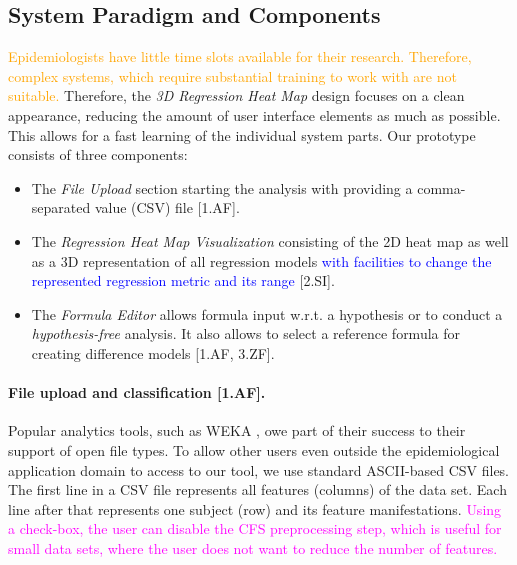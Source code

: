 \documentclass[journal]{style/vgtc} 			          %
\newcommand{\add}[1]{\textcolor{blue}{#1}}
\newcommand{\design}[1]{\textcolor{orange}{#1}}
\newcommand{\magenta}[1]{\textcolor{magenta}{#1}}
\begin{document}
\subsection{System Paradigm and Components}
\design{
Epidemiologists have little time slots available for their research.
Therefore, complex systems, which require substantial training to work with are not suitable. %
}
Therefore, the \emph{3D Regression Heat Map} design focuses on a clean appearance, reducing the amount of user interface elements as much as possible.
This allows for a fast learning of the individual system parts.
Our prototype consists of three components:
\begin{itemize}
	\item The \emph{File Upload} section starting the analysis with providing a comma-separated value (CSV) file [1.AF].
	\item The \emph{Regression Heat Map Visualization} consisting of the 2D heat map as well as a 3D representation of all regression models \add{with facilities to change the represented regression metric and its range} [2.SI].
	\item The \emph{Formula Editor} allows formula input w.r.t. a hypothesis or to conduct a \emph{hypothesis-free} analysis.
	It also allows to select a reference formula for creating difference models [1.AF, 3.ZF].
\end{itemize}
\paragraph{File upload and classification [\textbf{1.AF}].}
Popular analytics tools, such as WEKA \cite{WEKA}, owe part of their success to their support of open file types.
To allow other users even outside the epidemiological application domain to access to our tool, we use standard ASCII-based CSV files.
The first line in a CSV file represents all features (columns) of the data set.
Each line after that represents one subject (row) and its feature manifestations.
\magenta{Using a check-box, the user can disable the CFS preprocessing step, which is useful for small data sets, where the user does not want to reduce the number of features.}
\end{document}
